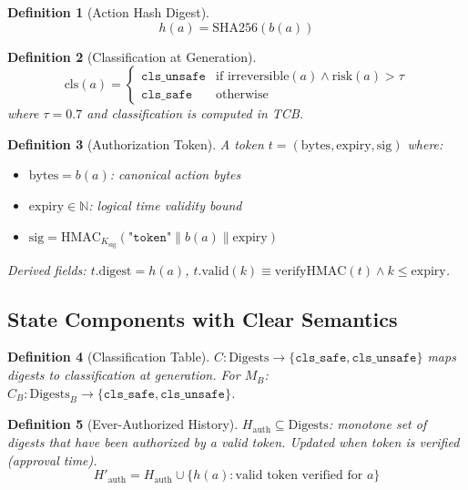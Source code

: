\documentclass[12pt]{article}
\newtheorem{definition}{Definition}[section]
\begin{document}
\begin{definition}[Action Hash Digest]
\[
h(a) = \mathrm{SHA256}(b(a))
\]
\end{definition}

\begin{definition}[Classification at Generation]
\[
\mathrm{cls}(a) = 
\begin{cases}
\texttt{cls\_unsafe} & \text{if } \text{irreversible}(a) \land \text{risk}(a) > \tau \\
\texttt{cls\_safe} & \text{otherwise}
\end{cases}
\]
where $\tau=0.7$ and classification is computed in TCB.
\end{definition}

\begin{definition}[Authorization Token]
A token $t = (\mathrm{bytes}, \mathrm{expiry}, \mathrm{sig})$ where:
\begin{itemize}
    \item $\mathrm{bytes} = b(a)$: canonical action bytes
    \item $\mathrm{expiry} \in \mathbb{N}$: logical time validity bound
    \item $\mathrm{sig} = \mathrm{HMAC}_{K_{\text{sig}}}(\texttt{"token"}\|b(a)\|\text{expiry})$
\end{itemize}
Derived fields: $t.\mathrm{digest} = h(a)$, $t.\mathrm{valid}(k) \equiv \text{verifyHMAC}(t) \land k \leq \mathrm{expiry}$.
\end{definition}

\subsection{State Components with Clear Semantics}

\begin{definition}[Classification Table]
$C: \mathrm{Digests} \to \{\texttt{cls\_safe}, \texttt{cls\_unsafe}\}$ maps digests to classification at generation. For $M_B$: $C_B: \mathrm{Digests}_B \to \{\texttt{cls\_safe}, \texttt{cls\_unsafe}\}$.
\end{definition}

\begin{definition}[Ever-Authorized History]
$H_{\text{auth}} \subseteq \mathrm{Digests}$: monotone set of digests that have been authorized by a valid token. Updated when token is verified (approval time).
\[
H'_{\text{auth}} = H_{\text{auth}} \cup \{h(a) : \text{valid token verified for } a\}
\]
\end{definition}
\end{document}
